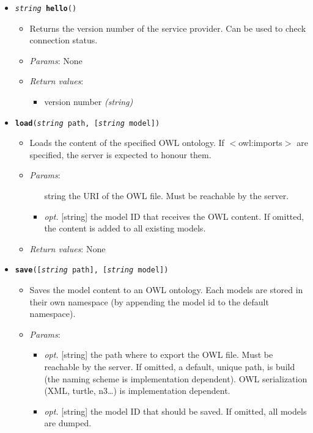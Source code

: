 \begin{itemize}

\item  \texttt{\emph{string} \textbf{hello}()}
    \begin{itemize}
    \item  Returns the version number of the service provider. Can be used to
    check connection status.
    \item  \emph{Params}: None
    \item  \emph{Return values}:
        \begin{itemize}
        \item  version number \emph{(string)}
        \end{itemize}
    \end{itemize}

\item  \texttt{\textbf{load}(\emph{string} path, [\emph{string} model])}
    \begin{itemize}
    \item  Loads the content of the specified OWL ontology. If
    $<$owl:imports$>$ are specified, the server is expected to honour them.
    \item  \emph{Params}:
        \begin{itemize}
        \item  [string] the URI of the OWL file. Must be reachable by the
        server.
        \item  \emph{opt.} [string] the model ID that receives the OWL content.
        If omitted, the content is added to all existing models. 
        \end{itemize}

    \item  \emph{Return values}: None
    \end{itemize}

\item  \texttt{\textbf{save}([\emph{string} path], [\emph{string} model])}
\begin{itemize}
\item  Saves the model content to an OWL ontology. Each models are stored in their own namespace (by appending the model id to the default namespace).
\item  \emph{Params}:
\begin{itemize}
\item  \emph{opt.} [string] the path where to export the OWL file. Must be reachable by the server. If omitted, a default, unique path, is build (the naming scheme is implementation dependent). OWL serialization (XML, turtle, n3\ldots{}) is implementation dependent.
\item  \emph{opt.} [string] the model ID that should be saved. If omitted, all models are dumped.
\end{itemize}


\end{itemize}
\end{itemize}
